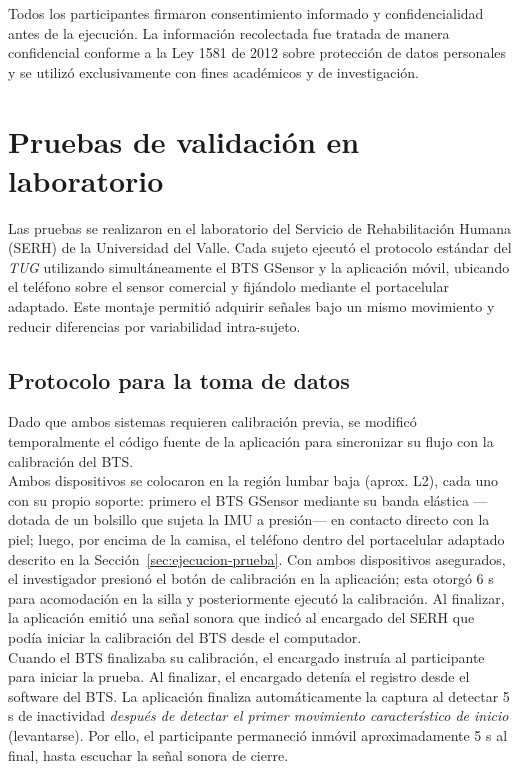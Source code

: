 \documentclass[12pt]{report}
\begin{document}
\begin{justify}
    Todos los participantes firmaron consentimiento informado y confidencialidad antes de la ejecución. La información recolectada fue tratada de manera confidencial conforme a la Ley 1581 de 2012 sobre protección de datos personales y se utilizó exclusivamente con fines académicos y de investigación.


    \section{Pruebas de validación en laboratorio}
    \label{sec:pruebas-validacion}

    Las pruebas se realizaron en el laboratorio del Servicio de Rehabilitación Humana (SERH) de la Universidad del Valle. Cada sujeto ejecutó el protocolo estándar del \textit{TUG} utilizando simultáneamente el BTS GSensor y la aplicación móvil, ubicando el teléfono sobre el sensor comercial y fijándolo mediante el portacelular adaptado. Este montaje permitió adquirir señales bajo un mismo movimiento y reducir diferencias por variabilidad intra-sujeto.\\

    \subsection{Protocolo para la toma de datos}
    \label{subsec:protocolo-validacion}

    Dado que ambos sistemas requieren calibración previa, se modificó temporalmente el código fuente de la aplicación para sincronizar su flujo con la calibración del BTS.\\

    Ambos dispositivos se colocaron en la región lumbar baja (aprox. L2), cada uno con su propio soporte: primero el BTS GSensor mediante su banda elástica —dotada de un bolsillo que sujeta la IMU a presión— en contacto directo con la piel; luego, por encima de la camisa, el teléfono dentro del portacelular adaptado descrito en la Sección~\ref{sec:ejecucion-prueba}. Con ambos dispositivos asegurados, el investigador presionó el botón de calibración en la aplicación; esta otorgó 6 s para acomodación en la silla y posteriormente ejecutó la calibración. Al finalizar, la aplicación emitió una señal sonora que indicó al encargado del SERH que podía iniciar la calibración del BTS desde el computador.\\

    Cuando el BTS finalizaba su calibración, el encargado instruía al participante para iniciar la prueba. Al finalizar, el encargado detenía el registro desde el software del BTS. La aplicación finaliza automáticamente la captura al detectar 5 s de inactividad \textit{después de detectar el primer movimiento característico de inicio} (levantarse). Por ello, el participante permaneció inmóvil aproximadamente 5 s al final, hasta escuchar la señal sonora de cierre.\\


\end{justify}
\end{document}
